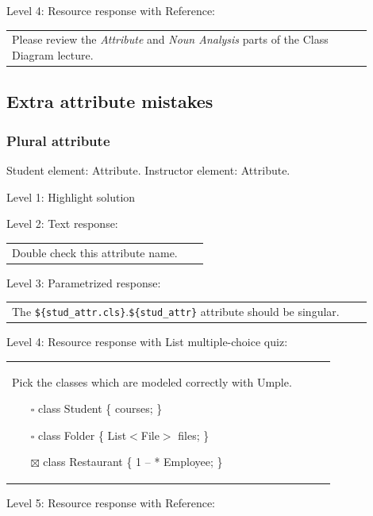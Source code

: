 \noindent Level 4: Resource response with Reference: \medskip

\begin{tabular}{|p{0.9\linewidth}}
Please review the \textit{Attribute} and \textit{Noun Analysis} parts of the Class Diagram lecture.
\end{tabular} \medskip


\subsection{Extra attribute mistakes}

\subsubsection{Plural attribute}

Student element: Attribute. Instructor element: Attribute. \medskip

\noindent Level 1: Highlight solution  \medskip

\noindent Level 2: Text response: \medskip

\begin{tabular}{|p{0.9\linewidth}}
Double check this attribute name.
\end{tabular} \medskip

\noindent Level 3: Parametrized response: \medskip

\begin{tabular}{|p{0.9\linewidth}}
The \verb|${stud_attr.cls}|.\verb|${stud_attr}| attribute should be singular.
\end{tabular} \medskip

\noindent Level 4: Resource response with List multiple-choice quiz: \medskip

\begin{tabular}{|p{0.9\linewidth}}

Pick the classes which are modeled correctly with Umple.

\begin{itemize}
    \item[$\square$] class Student \{ courses; \}
    \item[$\square$] class Folder \{ List$<$File$>$ files; \}
    \item[$\boxtimes$] class Restaurant \{ 1 -- * Employee; \}
\end{itemize}

\end{tabular} \medskip

\noindent Level 5: Resource response with Reference: \medskip

